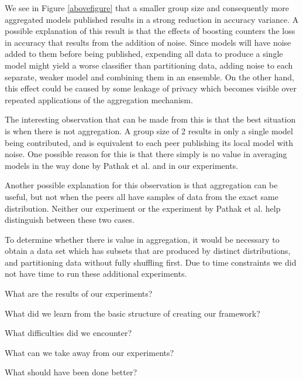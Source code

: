 
We see in Figure \ref{abovefigure} that a smaller group size and consequently more aggregated models published results in a strong reduction in accuracy variance. A possible explanation of this result is that the effects of boosting counters the loss in accuracy that results from the addition of noise. Since models will have noise added to them before being published, expending all data to produce a single model might yield a worse classifier than partitioning data, adding noise to each separate, weaker model and combining them in an ensemble. On the other hand, this effect could be caused by some leakage of privacy which becomes visible over repeated applications of the aggregation mechanism.  


The interesting observation that can be made from this is that the best situation is when there is not aggregation. A group size of 2 results in only a single model being contributed, and is equivalent to each peer publishing its local model with noise. One possible reason for this is that there simply is no value in averaging models in the way done by Pathak et al.\cite{pathak2010diffprivhomo} and in our experiments.

Another possible explanation for this observation is that aggregation can be useful, but not when the peers all have samples of data from the exact same distribution. Neither our experiment or the experiment by Pathak et al. help distinguish between these two cases. 

To determine whether there is value in aggregation, it would be necessary to obtain a data set which has subsets that are produced by distinct distributions, and partitioning data without fully shuffling first. Due to time constraints we did not have time to run these additional experiments. 

What are the results of our experiments?

What did we learn from the basic structure of creating our framework?

What difficulties did we encounter?

What can we take away from our experiments?

What should have been done better? 

